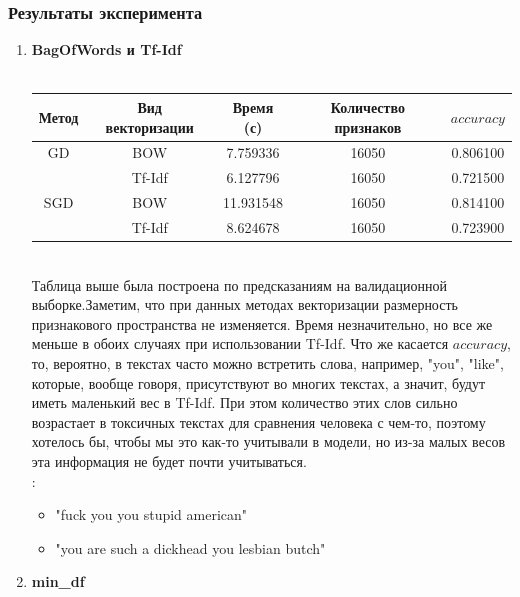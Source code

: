 \subsubsection{Результаты эксперимента}
\begin{enumerate}
	\item {\bf BagOfWords и Tf-Idf}\\ \\
	\begin{tabular}{|c|c|c|c|c|}
		\hline
			Метод & Вид векторизации & Время (с)  & Количество признаков & $accuracy$ \\
		\hline
		\hline
			GD 
			& BOW & 7.759336 &  16050 &  0.806100\\ \cline{2-5}
			& Tf-Idf & 6.127796 & 16050 & 0.721500 \\
		\hline
			SGD 
			& BOW & 11.931548 &  16050 & 0.814100 \\ \cline{2-5}
			& Tf-Idf & 8.624678 & 16050 & 0.723900 \\
		\hline
	\end{tabular}\\

	Таблица выше была построена по предсказаниям на валидационной выборке.Заметим, что при данных методах векторизации размерность признакового пространства не изменяется. Время незначительно, но все же меньше в обоих случаях при использовании Tf-Idf. Что же касается $accuracy$, то, вероятно, в текстах часто можно встретить слова, например, "you"{}, "like"{}, которые, вообще говоря, присутствуют во многих текстах, а значит, будут иметь маленький вес в Tf-Idf. При этом количество этих слов сильно возрастает в токсичных текстах для сравнения человека с чем-то, поэтому хотелось бы, чтобы мы это как-то учитывали в модели, но из-за малых весов эта информация не будет почти учитываться. \\
	{: }
	\begin{itemize}
		\item "fuck you  you stupid american"
		\item "you are such a dickhead  you lesbian butch"
	\end{itemize}
	
	\item {\bf min\_df}\\ 
	

\end{enumerate}
